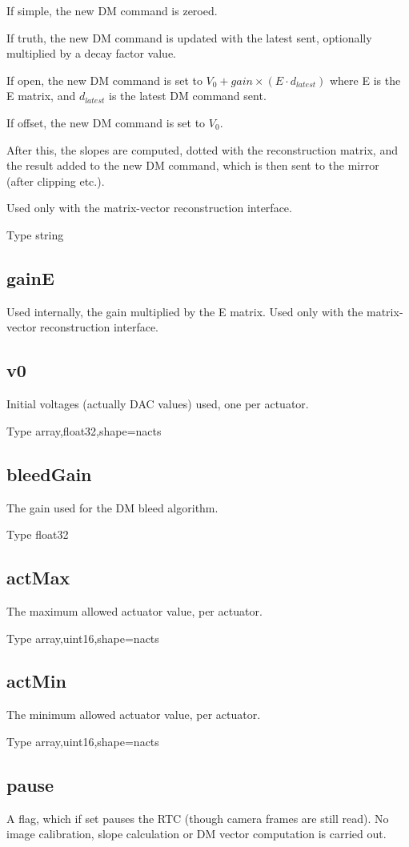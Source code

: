 \documentclass[a4,10pt]{article}
\begin{document}
If simple, the new DM command is zeroed.  

If truth, the new DM command is updated with the latest sent,
optionally multiplied by a decay factor value.

If open, the new DM command is set to $V_0 + gain \times (E \cdot
d_{latest})$ where E is the E matrix, and $d_{latest}$ is the latest DM
command sent.

If offset, the new DM command is set to $V_0$.

After this, the slopes are computed, dotted with the reconstruction
matrix, and the result added to the new DM command, which is then sent
to the mirror (after clipping etc.).

Used only with the matrix-vector
reconstruction interface.

Type string

\subsection{gainE}
Used internally, the gain multiplied by the E matrix.  Used only with the matrix-vector
reconstruction interface.


\subsection{v0}
Initial voltages (actually DAC values) used, one per actuator.

Type array,float32,shape=nacts

\subsection{bleedGain}
The gain used for the DM bleed algorithm.

Type float32

\subsection{actMax}
The maximum allowed actuator value, per actuator.

Type array,uint16,shape=nacts

\subsection{actMin}
The minimum allowed actuator value, per actuator.

Type array,uint16,shape=nacts

\subsection{pause}
A flag, which if set pauses the RTC (though camera frames are still
read).  No image calibration, slope calculation or DM vector
computation is carried out.
\end{document}
